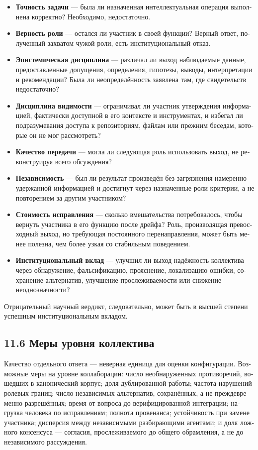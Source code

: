 \begin{russian}
\begin{itemize}
  \item \textbf{Точность задачи} — была ли назначенная интеллектуальная операция выполнена корректно? Необходимо, недостаточно.
  \item \textbf{Верность роли} — остался ли участник в своей функции? Верный ответ, полученный захватом чужой роли, есть институциональный отказ.
  \item \textbf{Эпистемическая дисциплина} — различал ли выход наблюдаемые данные, предоставленные допущения, определения, гипотезы, выводы, интерпретации и рекомендации? Была ли неопределённость заявлена там, где свидетельств недостаточно?
  \item \textbf{Дисциплина видимости} — ограничивал ли участник утверждения информацией, фактически доступной в его контексте и инструментах, и избегал ли подразумевания доступа к репозиториям, файлам или прежним беседам, которые он не мог рассмотреть?
  \item \textbf{Качество передачи} — могла ли следующая роль использовать выход, не реконструируя всего обсуждения?
  \item \textbf{Независимость} — был ли результат произведён без загрязнения намеренно удержанной информацией и достигнут через назначенные роли критерии, а не повторением за другим участником?
  \item \textbf{Стоимость исправления} — сколько вмешательства потребовалось, чтобы вернуть участника в его функцию после дрейфа? Роль, производящая превосходный выход, но требующая постоянного перенаправления, может быть менее полезна, чем более узкая со стабильным поведением.
  \item \textbf{Институциональный вклад} — улучшил ли выход надёжность коллектива через обнаружение, фальсификацию, прояснение, локализацию ошибки, сохранение альтернатив, улучшение прослеживаемости или снижение неоднозначности?
\end{itemize}
Отрицательный научный вердикт, следовательно, может быть в высшей степени успешным институциональным вкладом.


\subsection*{11.6 Меры уровня коллектива}
\label{sec:ru:11.6}

Качество отдельного ответа — неверная единица для оценки конфигурации. Возможные меры на уровне коллаборации: число необнаруженных противоречий, вошедших в канонический корпус; доля дублированной работы; частота нарушений ролевых границ; число независимых альтернатив, сохранённых, а не преждевременно разрешённых; время от вопроса до верифицированной интеграции; нагрузка человека по исправлениям; полнота провенанса; устойчивость при замене участника; дисперсия между независимыми разбирающими агентами; и доля ложного консенсуса — согласия, прослеживаемого до общего обрамления, а не до независимого рассуждения.


\end{russian}
